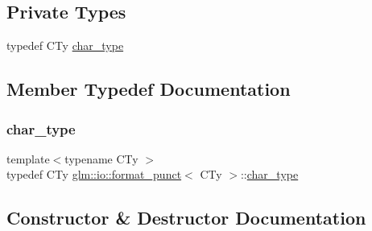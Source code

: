 \subsection*{Private Types}
\begin{DoxyCompactItemize}
\item 
typedef C\+Ty \mbox{\hyperlink{classglm_1_1io_1_1format__punct_ae94c42484a4c5258ad7b2f0f029efdf3}{char\+\_\+type}}
\end{DoxyCompactItemize}


\subsection{Member Typedef Documentation}
\mbox{\label{classglm_1_1io_1_1format__punct_ae94c42484a4c5258ad7b2f0f029efdf3}} 
\subsubsection{\texorpdfstring{char\+\_\+type}{char\_type}}
{\footnotesize\ttfamily template$<$typename C\+Ty $>$ \\
typedef C\+Ty \mbox{\hyperlink{classglm_1_1io_1_1format__punct}{glm\+::io\+::format\+\_\+punct}}$<$ C\+Ty $>$\+::\mbox{\hyperlink{classglm_1_1io_1_1format__punct_ae94c42484a4c5258ad7b2f0f029efdf3}{char\+\_\+type}}\hspace{0.3cm}{\ttfamily [private]}}



\subsection{Constructor \& Destructor Documentation}
\mbox{\label{classglm_1_1io_1_1format__punct_ae56e7a14fac2516658837281b9da4659}} 
